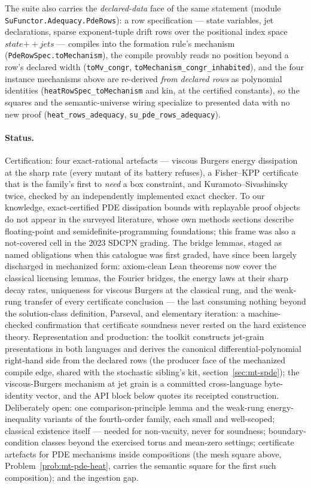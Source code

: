 The suite also carries the \emph{declared-data} face of the same
statement (module \texttt{SuFunctor.Adequacy.PdeRows}): a row
specification --- state variables, jet declarations, sparse
exponent-tuple drift rows over the positional index space
$\mathit{state} \mathbin{+\!\!+} \mathit{jets}$ --- compiles into the
formation rule's mechanism (\texttt{PdeRowSpec.toMechanism}), the
compile provably reads no position beyond a row's declared width
(\texttt{toMv\_congr},
\texttt{toMechanism\_congr\_inhabited}), and the four instance
mechanisms above are re-derived \emph{from declared rows} as
polynomial identities (\texttt{heatRowSpec\_toMechanism} and kin, at
the certified constants), so the squares and the semantic-universe
wiring specialize to presented data with no new proof
(\texttt{heat\_rows\_adequacy}, \texttt{su\_pde\_rows\_adequacy}).

\paragraph{Status.} Certification: four exact-rational artefacts ---
viscous Burgers energy dissipation at the sharp rate (every mutant of
its battery refuses), a Fisher--KPP certificate that is the family's
first to \emph{need} a box constraint, and Kuramoto--Sivashinsky
twice, checked by an independently implemented exact checker. To our
knowledge, exact-certified PDE dissipation bounds with replayable
proof objects do not appear in the surveyed literature, whose own
methods sections describe floating-point and semidefinite-programming
foundations; this frame was also a not-covered cell in the 2023 SDCPN
grading. The bridge lemmas, staged as named obligations when this
catalogue was first graded, have since been largely discharged in
mechanized form: axiom-clean Lean theorems now cover the classical
licensing lemmas, the Fourier bridges, the energy laws at their sharp
decay rates, uniqueness for viscous Burgers at the classical rung,
and the weak-rung transfer of every certificate conclusion --- the
last consuming nothing beyond the solution-class definition,
Parseval, and elementary iteration: a machine-checked confirmation
that certificate soundness never rested on the hard existence
theory. Representation and production: the toolkit constructs
jet-grain presentations in both languages and derives the canonical
differential-polynomial right-hand side from the declared rows (the
producer face of the mechanized compile edge, shared with the
stochastic sibling's kit, section~\ref{sec:mt-spde}); the
viscous-Burgers mechanism at jet grain is a committed cross-language
byte-identity vector, and the API block below quotes its receipted
construction. Deliberately open: one comparison-principle lemma and the
weak-rung energy-inequality variants of the fourth-order family,
each small and well-scoped; classical existence itself ---
needed for non-vacuity, never for soundness;
boundary-condition classes beyond the exercised torus and
mean-zero settings; certificate artefacts for PDE mechanisms inside
compositions (the mesh square above,
Problem~\ref{prob:mt-pde-heat}, carries the semantic square for the
first such composition); and the ingestion gap.

